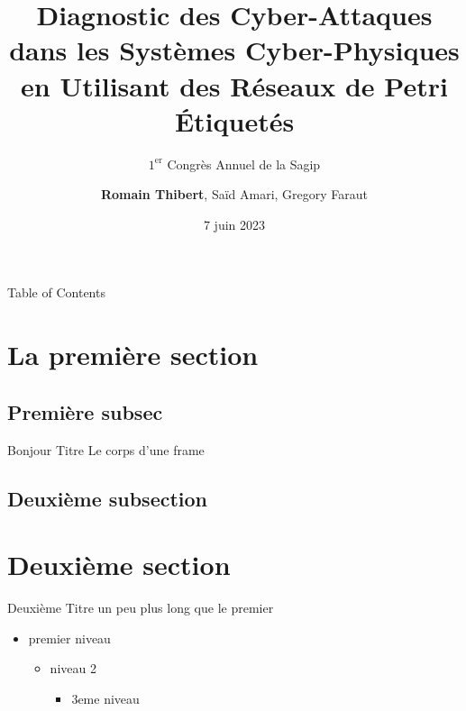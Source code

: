 \documentclass[aspectratio=169]{beamer}
\title{Diagnostic des Cyber-Attaques dans les Systèmes Cyber-Physiques en Utilisant des Réseaux de
Petri Étiquetés}
\subtitle{$1^{\mathrm{er}}$ Congrès Annuel de la Sagip}
\author[R.Thibert]{\textbf{Romain Thibert}, Saïd Amari, Gregory Faraut}
\date{7 juin 2023}
\begin{document}

\begin{frame}{Table of Contents}
\tableofcontents
\end{frame}

\section{La première section}

\subsection{Première subsec}

\begin{frame}{Bonjour Titre}
Le corps d'une frame
\end{frame}

\subsection{Deuxième subsection}

\section{Deuxième section}

\begin{frame}{Deuxième Titre un peu plus long que le premier}
\begin{itemize}
    \item premier niveau
    \begin{itemize}
        \item niveau 2
        \begin{itemize}
            \item 3eme niveau
        \end{itemize}
    \end{itemize}
\end{itemize}
\end{frame}

\end{document}
